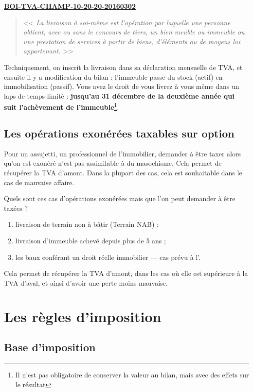 			 \medskip \href{http://bofip.impots.gouv.fr/bofip/134-PGP.html?identifiant=BOI-TVA-CHAMP-10-20-20-20160302}{\bfseries BOI-TVA-CHAMP-10-20-20-20160302}
			\begin{quote}
				<< {\itshape La livraison à soi-même est l'opération par laquelle une personne obtient, avec ou sans le concours de tiers, un bien meuble ou immeuble ou une prestation de services à partir de biens, d'éléments ou de moyens lui appartenant.} >>
			\end{quote}
			
			Techniquement, on inscrit la livraison dans sa déclaration mensuelle de TVA, et ensuite il y a modification du bilan : l'immeuble passe du stock (actif) en immobilisation (passif). Vous avez le droit de vous livrez à vous même dans un laps de temps limité : {\bfseries jusqu'au 31 décembre de la deuxième année qui suit l'achèvement de l'immeuble}\footnote{Il n'est pas obligatoire de conserver la valeur au bilan, mais avec des effets sur le résultat}.
	
	\subsection{Les opérations exonérées taxables sur option}
		
		Pour un assujetti, un professionnel de l'immobilier, demander à être taxer alors qu'on est exonéré n'est pas assimilable à du masochisme. Cela permet de récupérer la TVA d'amont. Dans la plupart des cas, cela est souhaitable dans le cas de mauvaise affaire.
		
		\medskip Quels sont ces cas d'opérations exonérées mais que l'on peut demander à être taxées ?
		\begin{enumerate}
			\item livraison de terrain non à bâtir (Terrain NAB) ;
			\item livraison d'immeuble achevé depuis plus de 5 ans ;
			\item les baux conférant un droit réelle immobilier --- cas prévu à l'.
		\end{enumerate}
	Cela permet de récupérer la TVA d'amont, dans les cas où elle est supérieure à la TVA d'aval, et ainsi d'avoir une perte moins mauvaise.
	
\section{Les règles d’imposition}

	\subsection{Base d’imposition}
		
